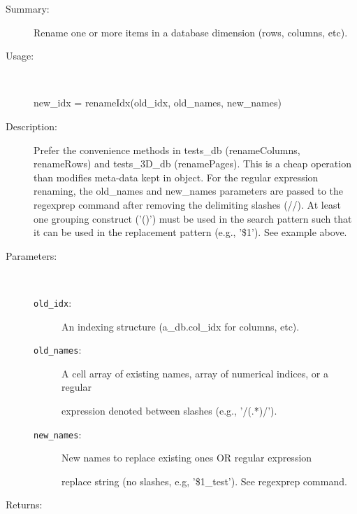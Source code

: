 \begin{description}
\item[Summary:]Rename one or more items in a database dimension (rows, columns, etc).
%
\item[Usage:]~%
\begin{lyxcode}%
new\_idx = renameIdx(old\_idx, old\_names, new\_names)
%
\end{lyxcode}%
%
\item[Description:]%
Prefer the convenience methods in tests\_db (renameColumns, renameRows) and
 tests\_3D\_db (renamePages). This is a cheap operation than modifies
 meta-data kept in object. For the regular expression renaming, the
 old\_names and new\_names parameters are passed to the regexprep command
 after removing the delimiting slashes (//). At least one grouping
 construct ('()') must be used in the search pattern such that it can be
 used in the replacement pattern (e.g., '\$1'). See example above.
\item[Parameters:]~
\begin{description}%
\item[\texttt{old\_idx}:]
 An indexing structure (a\_db.col\_idx for columns, etc).
\item[\texttt{old\_names}:]
 A cell array of existing names, array of numerical indices, or a regular

expression denoted between slashes (e.g., '/(.*)/').
\item[\texttt{new\_names}:]
 New names to replace existing ones OR regular expression

replace string (no slashes, e.g, '\$1\_test'). See regexprep command.
\end{description}%
%
\item[Returns:
]~


\end{description}
